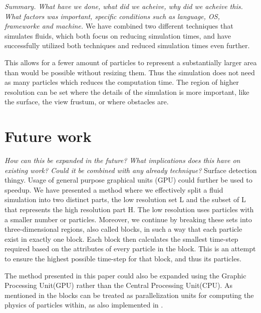 \documentclass[../../main.tex]{subfiles}
\begin{document}
\tracingall


\textit{Summary. What have we done, what did we acheive, why did we acheive this. What factors was important, specific conditions such as language, OS, frameworke and machine.}
We have combined two different techniques that simulates fluids, which both focus on reducing simulation times, and have successfully utilized both techniques and reduced simulation times even further.

This allows for a fewer amount of particles to represent a substantially larger area than would be possible without resizing them. Thus the simulation does not need as many particles which reduces the computation time. The region of higher resolution can be set where the details of the simulation is more important, like the surface, the view frustum, or where obstacles are.


\section{Future work}
\textit{How can this be expanded in the future? What implications does this have on existing work? Could it be combined with any already technique?}
Surface detection thingy. 
Usage of general purpose graphical units (GPU) could further be used to speedup. 
We have presented a method where we effectively split a fluid simulation into two distinct parts, the low resolution set L and the subset of L that represents the high resolution part H. The low resolution uses particles with a smaller number or particles.
Moreover, we continue by breaking these sets into three-dimensional regions, also called blocks, in such a way that each particle exist in exactly one block. Each block then calculates the smallest time-step required based on the attributes of every particle in the block. This is an attempt to ensure the highest possible time-step for that block, and thus its particles. 

The method presented in this paper could also be expanded using the Graphic Processing Unit(GPU) rather than the Central Processing Unit(CPU). As mentioned in \cite{goswami2014regional} the blocks can be treated as parallelization units for computing the physics of particles within, as also implemented in \cite{goswami2010interactive}.
\end{document}

